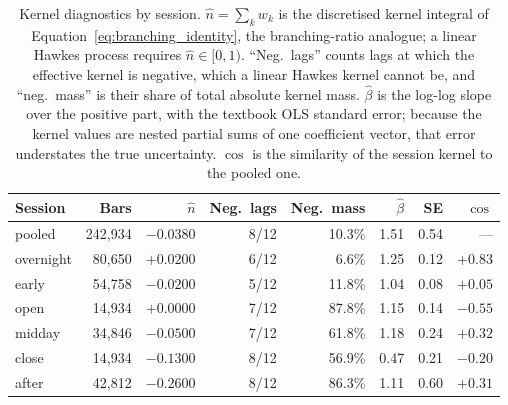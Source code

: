 \begin{table}[H]
\centering
\caption{Kernel diagnostics by session. $\hat n = \sum_k w_k$ is the
discretised kernel integral of Equation~\eqref{eq:branching_identity}, the
branching-ratio analogue; a linear Hawkes process requires $\hat n \in [0,1)$.
``Neg.\ lags'' counts lags at which the effective kernel is negative, which a
linear Hawkes kernel cannot be, and ``neg.\ mass'' is their share of total
absolute kernel mass. $\hat\beta$ is the log-log slope over the positive part,
with the textbook OLS standard error; because the kernel values are nested
partial sums of one coefficient vector, that error understates the true
uncertainty. $\cos$ is the similarity of the session kernel to the pooled one.}
\label{tab:hawkes_kernel}
\begin{tabular}{lrrrrrrr}
\toprule
Session & Bars & $\hat n$ & Neg.\ lags & Neg.\ mass & $\hat\beta$ & SE & $\cos$ \\
\midrule
pooled & 242{,}934 & $-0.0380$ & 8/12 & 10.3\% & 1.51 & 0.54 & --- \\
\midrule
overnight & 80{,}650 & $+0.0200$ & 6/12 & 6.6\% & 1.25 & 0.12 & $+0.83$ \\
early & 54{,}758 & $-0.0200$ & 5/12 & 11.8\% & 1.04 & 0.08 & $+0.05$ \\
open & 14{,}934 & $+0.0000$ & 7/12 & 87.8\% & 1.15 & 0.14 & $-0.55$ \\
midday & 34{,}846 & $-0.0500$ & 7/12 & 61.8\% & 1.18 & 0.24 & $+0.32$ \\
close & 14{,}934 & $-0.1300$ & 8/12 & 56.9\% & 0.47 & 0.21 & $-0.20$ \\
after & 42{,}812 & $-0.2600$ & 8/12 & 86.3\% & 1.11 & 0.60 & $+0.31$ \\
\bottomrule
\end{tabular}
\end{table}
